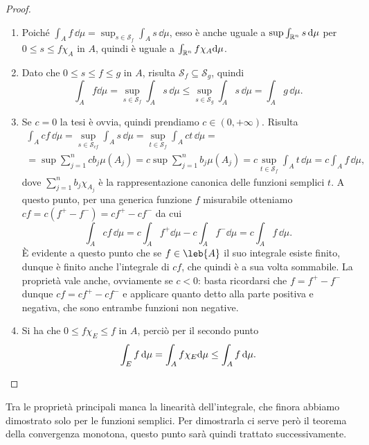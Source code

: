 \begin{proof}
	\begin{enumerate}
		\item Poich\'e $\int_Af\,\dd\mu=\sup_{s\in\mathcal S_f}\int_As\,\dd\mu$, esso è anche uguale a $\sup\int_{\mathbb{R}^n}s\,\textup{d}\mu$ per $0\leq s\leq f\chi_A$ in $A$, quindi è uguale a $\int_{\mathbb{R}^n}f\chi_A\textup{d}\mu$.
		\item Dato che $0\leq s\leq f\leq g$ in $A$, risulta $\mathcal S_f\subseteq\mathcal S_g$, quindi
			\begin{equation}
				\int_Af\dd\mu=\sup_{s\in\mathcal S_f}\int_As\,\dd\mu\leq\sup_{s\in\mathcal S_g}\int_As\,\dd\mu=\int_Ag\,\dd\mu.
			\end{equation}
		\item Se $c=0$ la tesi è ovvia, quindi prendiamo $c\in(0,+\infty)$.
			Risulta
			\begin{multline}
				\int_Acf\,\dd\mu=\sup_{s\in\mathcal S_{cf}}\int_As\,\dd\mu=\sup_{t\in\mathcal S_f}\int_Act\,\dd\mu=\\
				=\sup\sum_{j=1}^ncb_j\mu(A_j)=c\sup\sum_{j=1}^nb_j\mu(A_j)=c\sup_{t\in\mathcal S_f}\int_At\,\dd\mu=c\int_Af\,\dd\mu,
			\end{multline}
			dove $\sum_{j=1}^nb_j\chi_{A_j}$ è la rappresentazione canonica delle funzioni semplici $t$.
			A questo punto, per una generica funzione $f$ misurabile otteniamo $cf=c(f^+-f^-)=cf^+-cf^-$ da cui
			\begin{equation}
				\int_Acf\,\dd\mu=c\int_Af^+\dd\mu-c\int_Af^-\dd\mu=c\int_Af\,\dd\mu.
			\end{equation}
			È evidente a questo punto che se $f\in\leb{A}$ il suo integrale esiste finito, dunque è finito anche l'integrale di $cf$, che quindi è a sua volta sommabile.
			La proprietà vale anche, ovviamente se $c<0$: basta ricordarsi che $f=f^+-f^-$ dunque $cf=cf^+-cf^-$ e applicare quanto detto alla parte positiva e negativa, che sono entrambe funzioni non negative.
		\item Si ha che $0\leq f\chi_E\leq f$ in $A$, perciò per il secondo punto
			\begin{equation}
				\int_Ef\,\textup{d}\mu=\int_Af\chi_E\textup{d}\mu\leq \int_Af\,\textup{d}\mu.\qedhere
			\end{equation}
	\end{enumerate}
\end{proof}
Tra le proprietà principali manca la linearità dell'integrale, che finora abbiamo dimostrato solo per le funzioni semplici.
Per dimostrarla ci serve però il teorema della convergenza monotona, questo punto sarà quindi trattato successivamente.

